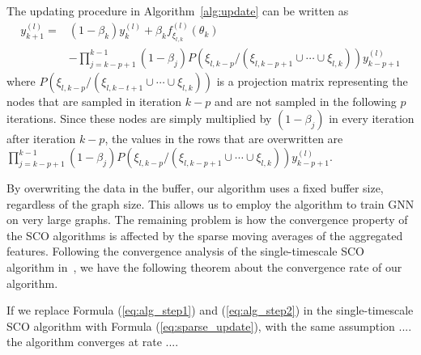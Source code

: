 The updating procedure in Algorithm~\ref{alg:update} can be written as 
  \begin{equation}
    \label{eq:sparse_update}
    \begin{split}
      y^{(l)}_{k+1} = &(1-\beta_{k})y^{(l)}_k + \beta_{k}  f^{(l)}_{\xi_{l,k}}(\theta_{k})\\
               &-\prod_{j=k-p+1}^{k-1}(1-\beta_j)P(\xi_{l, {k-p}}/(\xi_{l,{k-p+1}}\cup\cdots \cup\xi_{l,k}))y^{(l)}_{k-p+1}
    \end{split}
  \end{equation}
   where $P(\xi_{l, {k-p}}/(\xi_{l,{k-t+1}}\cup\cdots \cup\xi_{l,k}))$ is a projection matrix representing the nodes that are sampled in iteration $k-p$ and are not sampled in the following $p$ iterations. 
  Since these nodes are simply multiplied by $(1-\beta_j)$ in every iteration after iteration $k-p$, the values in the rows that are overwritten are $\prod_{j=k-p+1}^{k-1}(1-\beta_j)P(\xi_{l, {k-p}}/(\xi_{l,{k-p+1}}\cup\cdots \cup\xi_{l,k}))y^{(l)}_{k-p+1}$. 

By overwriting the data in the buffer, our algorithm uses a fixed buffer size, regardless of the graph size. 
This allows us to employ the algorithm to train GNN on very large graphs.  
The remaining problem is how the convergence property of the SCO algorithms is affected by the sparse moving averages of the aggregated features. 
Following the convergence analysis of the single-timescale SCO algorithm in~\cite{balasubramanian2020stochastic}, we have the following theorem about the convergence rate of our algorithm. 

\begin{theorem}
  If we replace Formula (\ref{eq:alg_step1}) and (\ref{eq:alg_step2}) in the single-timescale SCO algorithm with Formula (\ref{eq:sparse_update}), 
  with the same assumption ....
  the algorithm converges at rate ....
\end{theorem}
















